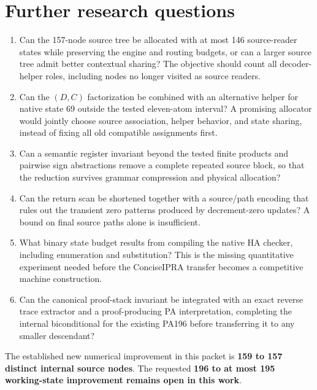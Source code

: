 \documentclass[11pt,letterpaper]{article}
\begin{document}
\section{Further research questions}

\begin{enumerate}
\item Can the 157-node source tree be allocated with at most 146 source-reader
states while preserving the engine and routing budgets, or can a larger
source tree admit better contextual sharing? The objective should count
all decoder-helper roles, including nodes no longer visited as source
readers.
\item Can the $(D,C)$ factorization be combined with an alternative helper
for native state 69 outside the tested eleven-atom interval? A promising
allocator would jointly choose source association, helper behavior, and
state sharing, instead of fixing all old compatible assignments first.
\item Can a semantic register invariant beyond the tested finite products
and pairwise sign abstractions remove a complete repeated source block,
so that the reduction survives grammar compression and physical allocation?
\item Can the return scan be shortened together with a source/path encoding
that rules out the transient zero patterns produced by decrement-zero
updates? A bound on final source paths alone is insufficient.
\item What binary state budget results from compiling the native HA
checker, including enumeration and substitution? This is the missing
quantitative experiment needed before the ConciseIPRA transfer becomes a
competitive machine construction.
\item Can the canonical proof-stack invariant be integrated with an exact
reverse trace extractor and a proof-producing PA interpretation, completing
the internal biconditional for the existing PA196 before transferring it to
any smaller descendant?
\end{enumerate}

\noindent The established new numerical improvement in this packet is
\textbf{159 to 157 distinct internal source nodes}. The requested
\textbf{196 to at most 195 working-state improvement remains open in this
work}.
\end{document}
